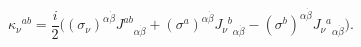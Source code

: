 \begin{equation}
\kappa_\nu{}^{ab} = \frac{i}2 \Big( 
(\sigma_\nu)^{\alpha\dot\beta} J^{ab}{}_{\alpha\dot\beta}
+(\sigma^a)^{\alpha\dot\beta} J_\nu{}^b{}_{\alpha\dot\beta}
-(\sigma^b)^{\alpha\dot\beta} J_\nu{}^a{}_{\alpha\dot\beta} \Big).
\label{eq:kappa_def}
\end{equation}

